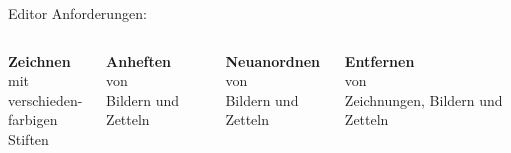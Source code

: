\documentclass[11pt]{beamer}
\begin{document}
\begin{frame}{Editor}
  Anforderungen:\\
  \pause
  \begin{columns}[t]
    \begin{column}{0.24\textwidth}
      \begin{center}
        \textbf{Zeichnen}\\mit\\verschieden-\\farbigen Stiften
      \end{center}
    \end{column}
    \pause
    \begin{column}{0.24\textwidth}
      \begin{center}
        \textbf{Anheften}\\von\\Bildern und Zetteln
      \end{center}
    \end{column}
    \pause
    \begin{column}{0.24\textwidth}
      \begin{center}
        \textbf{Neuanordnen}\\von\\Bildern und Zetteln
      \end{center}
    \end{column}
    \pause
    \begin{column}{0.24\textwidth}
      \begin{center}
        \textbf{Entfernen}\\von\\Zeichnungen, Bildern und Zetteln
      \end{center}
    \end{column}
  \end{columns}



\end{frame}
\end{document}
